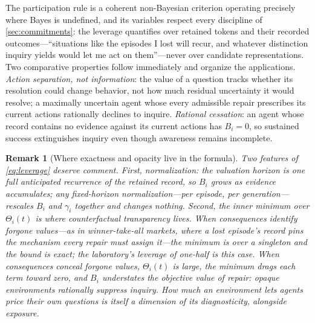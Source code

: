 \documentclass[11pt]{article}
\newtheorem{remark}[assumption]{Remark}
\theoremstyle{definition}
\begin{document}
The participation rule is a coherent non-Bayesian criterion operating
precisely where Bayes is undefined, and its variables respect every
discipline of \cref{sec:commitments}: the leverage quantifies over retained
tokens and their recorded outcomes---``situations like the episodes I lost
will recur, and whatever distinction inquiry yields would let me act on
them''---never over candidate representations.  Two comparative properties
follow immediately and organize the applications.  \emph{Action separation,
not information}: the value of a question tracks whether its resolution
could change behavior, not how much residual uncertainty it would resolve;
a maximally uncertain agent whose every admissible repair prescribes its
current actions rationally declines to inquire.  \emph{Rational cessation}:
an agent whose record contains no evidence against its current actions has
$B_i=0$, so sustained success extinguishes inquiry even though awareness
remains incomplete.

\begin{remark}[Where exactness and opacity live in the formula]
\label{rem:transparency}
Two features of \cref{eq:leverage} deserve comment.  First, normalization:
the valuation horizon is one full anticipated recurrence of the retained
record, so $B_i$ grows as evidence accumulates; any fixed-horizon
normalization---per episode, per generation---rescales $B_i$ and $\gamma_i$
together and changes nothing.  Second, the inner minimum over $\Theta_i(t)$
is where \emph{counterfactual transparency} lives.  When consequences
identify forgone values---as in winner-take-all markets, where a lost
episode's record pins the mechanism every repair must assign it---the
minimum is over a singleton and the bound is exact; the laboratory's
leverage of one-half is this case.  When consequences conceal forgone
values, $\Theta_i(t)$ is large, the minimum drags each term toward zero, and
$B_i$ understates the objective value of repair: opaque environments
rationally suppress inquiry.  How much an environment lets agents price
their own questions is itself a dimension of its diagnosticity, alongside
exposure.
\end{remark}
\end{document}
